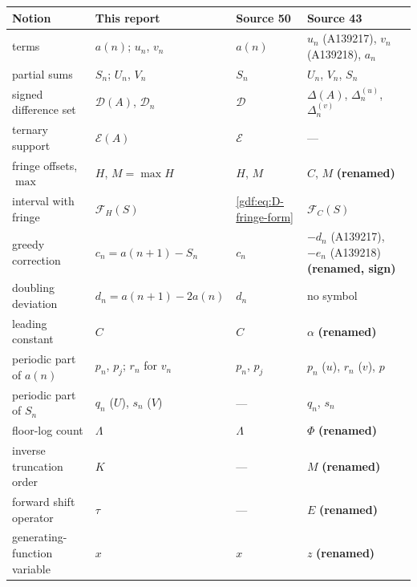\documentclass[11pt,a4paper]{article}
\numberwithin{equation}{section}
\theoremstyle{definition}
\theoremstyle{remark}
\theoremstyle{plain}
\newcommand{\cD}{\mathcal D}
\newcommand{\cE}{\mathcal E}
\newcommand{\cF}{\mathcal F}
\begin{document}
\begin{center}
\small
\begin{tabular}{>{\raggedright\arraybackslash}p{4.0cm}>{\raggedright\arraybackslash}p{3.5cm}>{\raggedright\arraybackslash}p{2.1cm}>{\raggedright\arraybackslash}p{4.6cm}}
\toprule
Notion & This report & Source 50 & Source 43\\
\midrule
terms & $a(n)$; $u_n$, $v_n$ & $a(n)$ & $u_n$ (A139217), $v_n$ (A139218), $a_n$\\
partial sums & $S_n$; $U_n$, $V_n$ & $S_n$ & $U_n$, $V_n$, $S_n$\\
signed difference set & $\cD(A)$, $\cD_n$ & $\cD$ & $\Delta(A)$, $\Delta_n^{(u)}$, $\Delta_n^{(v)}$\\
ternary support & $\cE(A)$ & $\cE$ & ---\\
fringe offsets, $\max$ & $H$, $M=\max H$ & $H$, $M$ & $C$, $M$ \textbf{(renamed)}\\
interval with fringe & $\cF_H(S)$ & \eqref{gdf:eq:D-fringe-form} & $\mathcal F_C(S)$\\
greedy correction & $c_n=a(n+1)-S_n$ & $c_n$ & $-d_n$ (A139217), $-e_n$ (A139218) \textbf{(renamed, sign)}\\
doubling deviation & $d_n=a(n+1)-2a(n)$ & $d_n$ & no symbol\\
leading constant & $C$ & $C$ & $\alpha$ \textbf{(renamed)}\\
periodic part of $a(n)$ & $p_n$, $p_j$; $r_n$ for $v_n$ & $p_n$, $p_j$ & $p_n$ ($u$), $r_n$ ($v$), $p$\\
periodic part of $S_n$ & $q_n$ ($U$), $s_n$ ($V$) & --- & $q_n$, $s_n$\\
floor-log count & $\Lambda$ & $\Lambda$ & $\Phi$ \textbf{(renamed)}\\
inverse truncation order & $K$ & --- & $M$ \textbf{(renamed)}\\
forward shift operator & $\tau$ & --- & $E$ \textbf{(renamed)}\\
generating-function variable & $x$ & $x$ & $z$ \textbf{(renamed)}\\
\bottomrule
\end{tabular}
\end{center}
\end{document}
